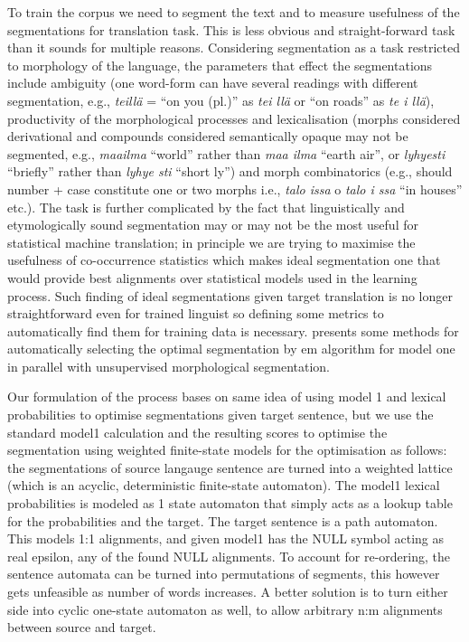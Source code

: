 \documentclass[11pt,letterpaper]{article}
\begin{document}
To train the corpus we need to segment the text and to measure usefulness of
the segmentations for translation task. This is less obvious and
straight-forward task than it sounds for multiple reasons. Considering
segmentation as a task restricted to morphology of the language, the parameters
that effect the segmentations include ambiguity (one word-form can have several
readings with different segmentation, e.g., \emph{teillä} = ``on you (pl.)'' as
\emph{tei llä} or ``on roads'' as \emph{te i llä}), productivity of the
morphological processes and lexicalisation (morphs considered derivational and
compounds considered semantically opaque may not be segmented, e.g.,
\emph{maailma} ``world'' rather than \emph{maa ilma} ``earth air'', or
\emph{lyhyesti} ``briefly'' rather than \emph{lyhye sti} ``short ly'') and
morph combinatorics (e.g., should number + case constitute one or two morphs
i.e., \emph{talo issa} o \emph{talo i ssa} ``in houses'' etc.).  The task is
further complicated by the fact that linguistically and etymologically sound
segmentation may or may not be the most useful for statistical machine
translation; in principle we are trying to maximise the usefulness of
co-occurrence statistics which makes ideal segmentation one that would provide
best alignments over statistical models used in the learning process. Such
finding of ideal segmentations given target translation is no longer
straightforward even for trained linguist so defining some metrics to
automatically find them for training data is necessary.
\cite{mermer2010unsupervised} presents some methods for automatically selecting
the optimal segmentation by em algorithm for model one in parallel with
unsupervised morphological segmentation. 

Our formulation of the process bases on same idea of using model 1 and lexical
probabilities to optimise segmentations given target sentence, but we use the
standard model1 calculation and the resulting scores to optimise the
segmentation using weighted finite-state models for the optimisation as
follows: the segmentations of source langauge sentence are turned into a
weighted lattice (which is an acyclic, deterministic finite-state automaton).
The model1 lexical probabilities is modeled as 1 state automaton that simply
acts as a lookup table for the probabilities and the target. The target
sentence is a path automaton. This models 1:1 alignments, and given model1 has
the NULL symbol acting as real epsilon, any of the found NULL alignments. To
account for re-ordering, the sentence automata can be turned into permutations
of segments, this however gets unfeasible as number of words increases. A
better solution is to turn either side into cyclic one-state automaton as well,
to allow arbitrary n:m alignments between source and target.
\end{document}
